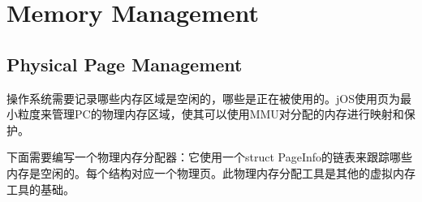 \chapter{Memory Management}
\label{cha:memory_management}

\section{Physical Page Management}
\label{sec:physical_page_management}
\par 操作系统需要记录哪些内存区域是空闲的，哪些是正在被使用的。jOS使用页为最小粒度来管理PC的物理内存区域，使其可以使用MMU对分配的内存进行映射和保护。
\par 下面需要编写一个物理内存分配器：它使用一个struct PageInfo的链表来跟踪哪些内存是空闲的。每个结构对应一个物理页。此物理内存分配工具是其他的虚拟内存工具的基础。

